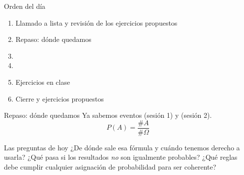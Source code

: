 \documentclass[aspectratio=169,10pt]{beamer}
\begin{document}
\portada

\begin{frame}{Orden del día}
  \begin{enumerate}
    \item Llamado a lista y revisión de los ejercicios propuestos
    \item Repaso: dónde quedamos
    \item {}
    \item {}
    \item Ejercicios en clase
    \item Cierre y ejercicios propuestos
  \end{enumerate}
\end{frame}

\begin{frame}{Repaso: dónde quedamos}
  Ya sabemos  eventos (sesión 1) y  (sesión 2).
  \[ P(A)=\frac{\#A}{\#\Omega} \]

  \vspace{0.2cm}
  \begin{alertblock}{Las preguntas de hoy}
    \footnotesize
    ¿De dónde sale esa fórmula y cuándo tenemos derecho a usarla? ¿Qué pasa si
    los resultados \emph{no} son igualmente probables? ¿Qué reglas debe cumplir
    cualquier asignación de probabilidad para ser coherente?
  \end{alertblock}
\end{frame}

\end{document}
